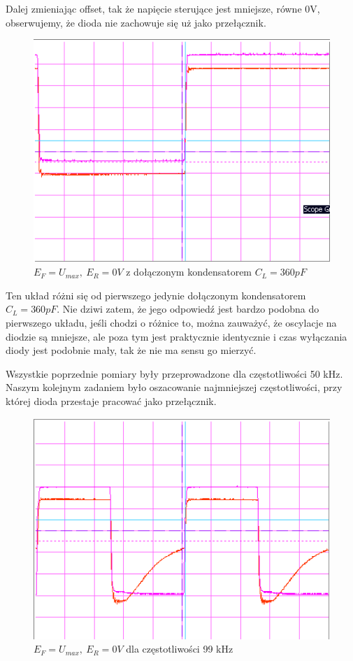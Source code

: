 \documentclass[a4paper,11pt]{article}
\begin{document}
Dalej zmieniając offset, tak że napięcie sterujące jest mniejsze, równe 0V, obserwujemy, że dioda nie zachowuje się uż jako przełącznik.

\begin{figure} [H]
  \begin{center}
    \includegraphics{../Obrazki_i_tekst/obrobione/1esciety.png}
    \caption{\( E_F = U_{max}, \ E_R = 0V \) z dołączonym kondensatorem \(C_L = 360 pF\)}
  \end{center}
\end{figure}

Ten układ różni się od pierwszego jedynie dołączonym kondensatorem \(C_L = 360 pF\). Nie dziwi zatem, że jego odpowiedź jest bardzo podobna do pierwszego układu, jeśli chodzi o różnice to, można zauważyć, że oscylacje na diodzie są mniejsze, ale poza tym jest praktycznie identycznie i czas wyłączania diody jest podobnie mały, tak że nie ma sensu go mierzyć.

Wszystkie poprzednie pomiary były przeprowadzone dla częstotliwości 50 kHz. Naszym kolejnym zadaniem było oszacowanie najmniejszej częstotliwości, przy której dioda przestaje pracować jako przełącznik.

\begin{figure} [H]
  \begin{center}
    \includegraphics{../Obrazki_i_tekst/obrobione/2ciety.png}
    \caption{\( E_F = U_{max}, \ E_R = 0V \) dla częstotliwości 99 kHz }
  \end{center}
\end{figure}
\end{document}
